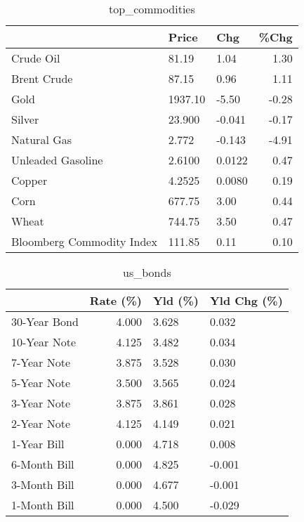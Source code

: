 \documentclass{article}%
\begin{document}
\begin{table}[htbp]%
\caption{top\_commodities}%
\centering%
\begin{adjustbox}{width=1\textwidth}%
\begin{tabular}{lllr}
\toprule
                          &   Price &    Chg &  \%Chg \\
\midrule
               Crude Oil  &   81.19 &   1.04 &  1.30 \\
             Brent Crude  &   87.15 &   0.96 &  1.11 \\
                    Gold  & 1937.10 &  -5.50 & -0.28 \\
                  Silver  &  23.900 & -0.041 & -0.17 \\
             Natural Gas  &   2.772 & -0.143 & -4.91 \\
       Unleaded Gasoline  &  2.6100 & 0.0122 &  0.47 \\
                  Copper  &  4.2525 & 0.0080 &  0.19 \\
                    Corn  &  677.75 &   3.00 &  0.44 \\
                   Wheat  &  744.75 &   3.50 &  0.47 \\
Bloomberg Commodity Index &  111.85 &   0.11 &  0.10 \\
\bottomrule
\end{tabular}
%
\end{adjustbox}%
\end{table}

%


\begin{table}[htbp]%
\caption{us\_bonds}%
\centering%
\begin{adjustbox}{width=1\textwidth}%
\begin{tabular}{lrll}
\toprule
             &  Rate (\%) & Yld (\%) & Yld Chg (\%) \\
\midrule
30-Year Bond &     4.000 &   3.628 &       0.032 \\
10-Year Note &     4.125 &   3.482 &       0.034 \\
 7-Year Note &     3.875 &   3.528 &       0.030 \\
 5-Year Note &     3.500 &   3.565 &       0.024 \\
 3-Year Note &     3.875 &   3.861 &       0.028 \\
 2-Year Note &     4.125 &   4.149 &       0.021 \\
 1-Year Bill &     0.000 &   4.718 &       0.008 \\
6-Month Bill &     0.000 &   4.825 &      -0.001 \\
3-Month Bill &     0.000 &   4.677 &      -0.001 \\
1-Month Bill &     0.000 &   4.500 &      -0.029 \\
\bottomrule
\end{tabular}
%
\end{adjustbox}%
\end{table}
\end{document}
